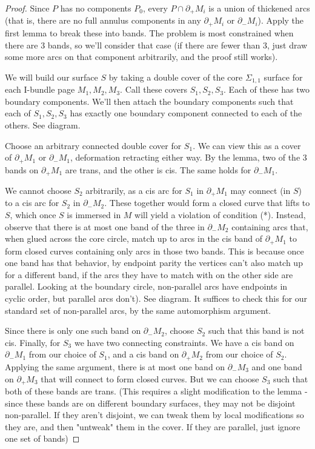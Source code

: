 \documentclass[12pt]{amsart}
\theoremstyle{definition}
\newcommand{\bd}{\partial}
\newcommand{\Si}{\Sigma}
\begin{document}
\begin{proof}

Since $P$ has no components $P_0$, every $P \cap \bd_+M_i$ is a union of
thickened arcs (that is, there are no full annulus components in any $\bd_+M_i$
or $\bd_-M_i$). Apply the first lemma to break these into bands. The problem is
most constrained when there are 3 bands, so we'll consider that case (if there
are fewer than 3, just draw some more arcs on that component arbitrarily, and
the proof still works).

We will build our surface $S$ by taking a double cover of the core $\Si_{1,1}$
surface for each I-bundle page $M_1,M_2,M_3$. Call these covers $S_1,S_2,S_3$.
Each of these has two boundary components. We'll then attach the boundary
components such that each of $S_1,S_2,S_3$ has exactly one boundary component
connected to each of the others. See diagram.

Choose an arbitrary connected double cover for $S_1$. We can view this as
a cover of $\bd_+M_1$ or $\bd_-M_1$, deformation retracting either way. By the
lemma, two of the
3 bands on $\bd_+M_1$ are trans, and the other is cis. The same holds for
  $\bd_-M_1$.

We cannot choose $S_2$ arbitrarily, as a cis arc for $S_1$ in $\bd_+M_1$ may
connect (in $S$) to a cis arc for $S_2$ in $\bd_-M_2$. These together would
form a closed curve that lifts to $S$, which once $S$ is immersed in $M$ will
yield a violation of condition (*). Instead, observe that there is at most one
band of the three in $\bd_-M_2$ containing arcs that, when glued across the
core circle, match up to arcs in the cis band of $\bd_+M_1$ to form closed
curves containing only arcs in those two bands. This is because once one band
has that behavior, by endpoint parity the vertices can't also match up for
a different band, if the arcs they have to match with on the other side are
parallel. Looking at the boundary circle, non-parallel arcs have endpoints in
cyclic order, but parallel arcs don't). See diagram. It suffices to check this
for our standard set of non-parallel arcs, by the same automorphism argument.

Since there is only one such band on $\bd_-M_2$, choose $S_2$ such that this
band is not cis.  Finally, for $S_3$ we have two connecting constraints. We
have a cis band on $\bd_-M_1$ from our choice of $S_1$, and a cis band on
$\bd_+M_2$ from our choice of $S_2$.  Applying the same argument, there is at
most one band on $\bd_-M_3$ and one band on $\bd_+M_3$ that will connect to
form closed curves. But we can choose $S_3$ such that both of these bands are
trans. (This requires a slight modification to the lemma - since these bands
are on different boundary surfaces, they may not be disjoint non-parallel. If
they aren't disjoint, we can tweak them by local modifications so they are, and
then "untweak" them in the cover. If they are parallel, just ignore one set of
bands)


\end{proof}
\end{document}
